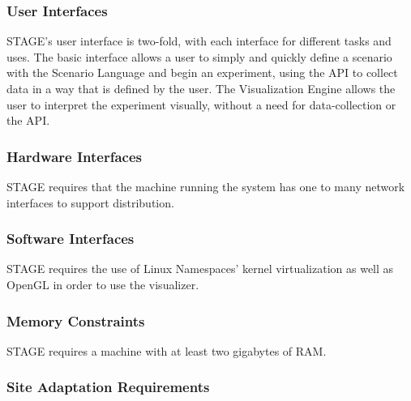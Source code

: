 \documentclass[titlepage]{article}
\begin{document}

\subsubsection{User Interfaces%
  \label{user-interfaces}%
}

STAGE's user interface is two-fold, with each interface for different tasks and uses. The basic interface allows a user to simply and quickly define a scenario with the Scenario Language and begin an experiment, using the API to collect data in a way that is defined by the user. The Visualization Engine allows the user to interpret the experiment visually, without a need for data-collection or the API.


\subsubsection{Hardware Interfaces%
  \label{hardware-interfaces}%
}

STAGE requires that the machine running the system has one to many network interfaces to support distribution.


\subsubsection{Software Interfaces%
  \label{software-interfaces}%
}

STAGE requires the use of Linux Namespaces' kernel virtualization as well as OpenGL in order to use the visualizer.


\subsubsection{Memory Constraints%
  \label{memory-constraints}%
}

STAGE requires a machine with at least two gigabytes of RAM.


\subsubsection{Site Adaptation Requirements%
  \label{site-adaptation-requirements}%
}
\end{document}

